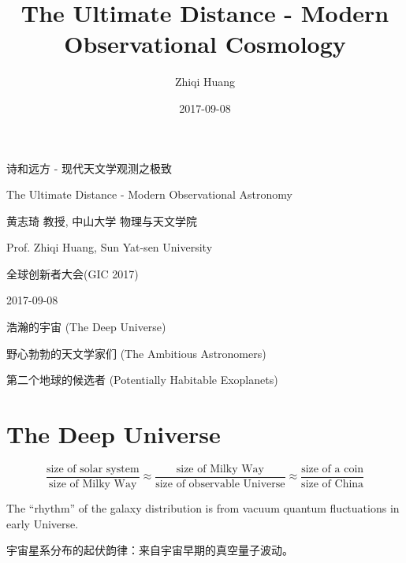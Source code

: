 \documentclass[CJK]{beamer}
\title{The Ultimate Distance - Modern Observational Cosmology}
\author{Zhiqi Huang}
\institute{Sun Yat-sen University}
\date{2017-09-08}
\begin{document}
\begin{frame}
  \bch
  \bcenter
      {\blue \Large 诗和远方 - 现代天文学观测之极致}

      {\blue \large The Ultimate Distance - Modern Observational Astronomy}      


      {\large 黄志琦 教授, 中山大学 物理与天文学院}
      
      { Prof. Zhiqi Huang, Sun Yat-sen University}      

      \skiplines
      
      全球创新者大会(GIC 2017)

      \skipline
      
      2017-09-08

      
      \ecenter
      \ech
\end{frame}



\begin{frame}
\centering
\bch
\bitem
\item{浩瀚的宇宙 (The Deep Universe)}
\item{野心勃勃的天文学家们 (The Ambitious Astronomers)}  
\item{第二个地球的候选者 (Potentially Habitable Exoplanets)}
  \eitem
  \ech
\end{frame}

\section{The Deep Universe}

\begin{frame}
  \bch

  {\small
   $$\frac{\text{size of solar system}}{\text{size of Milky Way}} \approx \frac{\text{size of Milky Way}}{\text{size of observable Universe}} \approx \frac{\text{size of a coin}}{\text{size of China}}$$}
  \ech
\end{frame}

\begin{frame}
  \bch

  The ``rhythm'' of the galaxy distribution is from vacuum quantum fluctuations in early Universe.

  
  宇宙星系分布的起伏韵律：来自宇宙早期的真空量子波动。

  
  \ech
\end{frame}
\end{document}
